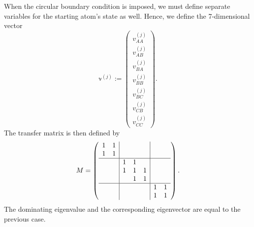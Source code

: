When the circular boundary condition is imposed,
we must define separate variables for the starting atom's state as well.
Hence, we define the 7-dimensional vector
\[
    \mathbb{v}^{(j)} := \begin{pmatrix}
        v^{(j)}_{AA} \\
        v^{(j)}_{AB} \\
        v^{(j)}_{BA} \\
        v^{(j)}_{BB} \\
        v^{(j)}_{BC} \\
        v^{(j)}_{CB} \\
        v^{(j)}_{CC}
    \end{pmatrix}.
\]
The transfer matrix is then defined by
\[
    M = \left(\begin{array}{cc|ccc|cc}
         1 & 1 &   &   &   &   &   \\
         1 & 1 &   &   &   &   &   \\
         \hline
           &   & 1 & 1 &   &   &   \\
           &   & 1 & 1 & 1 &   &   \\
           &   &   & 1 & 1 &   &   \\
        \hline
           &   &   &   &   & 1 & 1 \\
           &   &   &   &   & 1 & 1
    \end{array}\right).
\]
The dominating eigenvalue and the corresponding eigenvector
are equal to the previous case.
